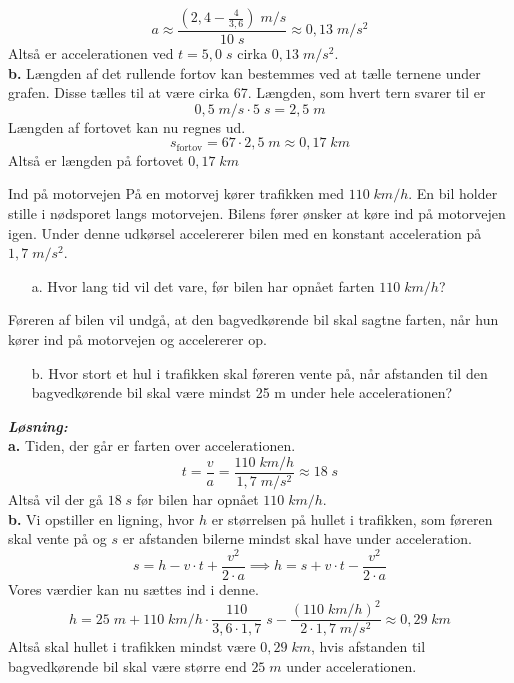 \documentclass{report}
\newcommand{\sol}{\setlength{\parindent}{0cm}\textbf{\textit{Løsning:}}\setlength{\parindent}{1cm}}
\begin{document}
\[
a \approx \frac{(2,4-\frac{4}{3,6})\;\unit{m/s} }{10 \;\unit{s} } \approx 0,13 \;\unit{m/s^2} 
\] 
Altså er accelerationen ved $t=5,0 \;\unit{s} $ cirka $0,13 \;\unit{m/s^2}$. \\[1ex]
\textbf{b.} Længden af det rullende fortov kan bestemmes ved at tælle ternene under grafen. 
Disse tælles til at være cirka 67.
Længden, som hvert tern svarer til er
\[
0,5 \;\unit{m/s} \cdot 5 \;\unit{s}=2,5 \;\unit{m}  
\] 
Længden af fortovet kan nu regnes ud.
\[
s_{\text{fortov}}=67\cdot 2,5 \;\unit{m} \approx 0,17 \;\unit{km} 
\] 
Altså er længden på fortovet $0,17 \;\unit{km} $
\begin{question}{Ind på motorvejen}{}
På en motorvej kører trafikken med $110 \;\unit{km/h} $.
En bil holder stille i nødsporet langs motorvejen.
Bilens fører ønsker at køre ind på motorvejen igen.
Under denne udkørsel accelererer bilen med en konstant acceleration på $1,7 \;\unit{m/s^2} $.
\begin{itemize}
  \item[a.] Hvor lang tid vil det vare, før bilen har opnået farten $110 \;\unit{km/h} $?
\end{itemize}
Føreren af bilen vil undgå, at den bagvedkørende bil skal sagtne farten, når hun kører ind på motorvejen og accelererer op.
\begin{itemize}
  \item[b.] Hvor stort et hul i trafikken skal føreren vente på, når afstanden til den bagvedkørende bil skal være mindst 25 m under hele accelerationen?
\end{itemize}
\end{question}
\sol \\ 
\textbf{a.} Tiden, der går er farten over accelerationen. 
\[
t=\frac{v}{a}=\frac{110 \;\unit{km/h} }{1,7 \;\unit{m/s^2} }\approx 18 \;\unit{s} 
\] 
Altså vil der gå $18 \;\unit{s} $ før bilen har opnået $110 \;\unit{km/h} $.\\[1ex]
\textbf{b.} Vi opstiller en ligning, hvor $h$ er størrelsen på hullet i trafikken, som føreren skal vente på og $s$ er afstanden bilerne mindst skal have under acceleration.
\[
s=h-v\cdot t + \frac{v^2}{2\cdot a}\implies h=s+v\cdot t-\frac{v^2}{2\cdot a}
\] 
Vores værdier kan nu sættes ind i denne.
\[
h=25 \;\unit{m} + 110 \;\unit{km/h} \cdot \frac{110}{3,6\cdot 1,7} \;\unit{s} - \frac{(110 \;\unit{km/h} )^2}{2\cdot 1,7 \;\unit{m/s^2} } \approx 0,29 \;\unit{km} 
\] 
Altså skal hullet i trafikken mindst være $0,29 \;\unit{km} $, hvis afstanden til bagvedkørende bil skal være større end $25 \;\unit{m} $ under accelerationen.
\end{document}
